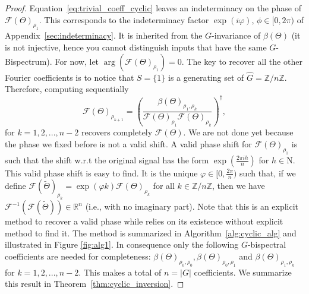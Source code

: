 \documentclass{article}
\theoremstyle{plain}
\theoremstyle{definition}
\theoremstyle{remark}
\begin{document}
\begin{proof}
Equation~\eqref{eq:trivial_coeff_cyclic} leaves an indeterminacy on the phase of $\mathcal{F}(\Theta)_{\rho_1}$. This corresponds to the indeterminacy factor $\exp(i \varphi)$, $\phi\in[0,2\pi)$ of Appendix~\ref{sec:indeterminacy}. It is inherited from the $G$-invariance  of $\beta(\Theta)$ (it is not injective, hence you cannot distinguish inputs that have the same $G$-Bispectrum). For now, let $\arg(\mathcal{F}(\Theta)_{\rho_1})=0$. The key to recover all the other Fourier coefficients is to notice that $S = \{1\}$ is a generating set of $\widehat{G} =\mathbb{Z}/n\mathbb{Z}$. Therefore, computing sequentially
\begin{equation}
    \mathcal{F}(\Theta)_{\rho_{k+1}} = \left(\frac{\beta(\Theta)_{\rho_1,\rho_k}}{\mathcal{F}(\Theta)_{\rho_1}\mathcal{F}(\Theta)_{\rho_k}}\right)^\dagger,
\end{equation}
for $k=1,2,...,n-2$ recovers completely $\mathcal{F}(\Theta)$. We are not done yet because the phase we fixed before is not a valid shift. A valid phase shift for $\mathcal{F}(\Theta)_{\rho_1}$ is such that the shift w.r.t the original signal has the form $\exp\left(\frac{2\pi i h}{n}\right)$ for $h\in\mathrm{N}$. This valid phase shift is easy to find. It is the unique $\varphi\in[0,\frac{2\pi}{n})$ such that, if we define $\mathcal{F}(\widetilde{\Theta})_{\rho_k} = \exp(\varphi k) \mathcal{F}(\Theta)_{\rho_{k}}$ for all $k\in\mathbb{Z}/n\mathbb{Z}$, then we have $\mathcal{F}^{-1}(\mathcal{F}(\widetilde{\Theta}))\in\mathbb{\mathbb{R}}^n$ (i.e., with no imaginary part). Note that this is an explicit method to recover a valid phase while \citep{kakarala_finite_groups} relies on its existence without explicit method to find it.
The method is summarized in Algorithm~\ref{alg:cyclic_alg} and illustrated in Figure \ref{fig:alg1}. In consequence only the following $G$-bispectral coefficients are needed for completeness: $\beta(\Theta)_{\rho_0,\rho_0}, \beta(\Theta)_{\rho_0,\rho_1}$ and $ \beta(\Theta)_{\rho_1,\rho_k}$ for $k=1,2,...,n-2$. This makes a total of $n=|G|$ coefficients. We summarize this result in Theorem~\ref{thm:cyclic_inversion}.
\end{proof}
\end{document}
